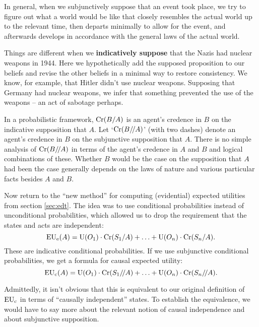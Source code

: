 In general, when we subjunctively suppose that an event took place, we try to
figure out what a world would be like that closely resembles the actual world up
to the relevant time, then departs minimally to allow for the event, and
afterwards develops in accordance with the general laws of the actual world.

Things are different when we \textbf{indicatively suppose} that the Nazis had
nuclear weapons in 1944. Here we hypothetically add the supposed proposition to
our beliefs and revise the other beliefs in a minimal way to restore
consistency. We know, for example, that Hitler didn't use nuclear weapons.
Supposing that Germany had nuclear weapons, we infer that something prevented
the use of the weapons -- an act of sabotage perhaps.

In a probabilistic framework, $\text{Cr}(B/A)$ is an agent's credence in $B$ on the
indicative supposition that $A$. Let `$\text{Cr}(B/\!/A)$' (with two dashes) denote an
agent's credence in $B$ on the subjunctive supposition that $A$. There is no
simple analysis of $\text{Cr}(B/\!/A)$ in terms of the agent's credence in $A$ and $B$
and logical combinations of these. Whether $B$ would be the case on the
supposition that $A$ had been the case generally depends on the laws of nature
and various particular facts besides $A$ and $B$.


Now return to the ``new method'' for computing (evidential) expected utilities
from section \ref{sec:edt}. The idea was to use conditional probabilities
instead of unconditional probabilities, which allowed us to drop the requirement
that the states and acts are independent:
\[
  \text{EU}_\text{e}(A) = \text{U}(O_1) \cdot \text{Cr}(S_1/A) + \ldots + \text{U}(O_n) \cdot \text{Cr}(S_n/A).
\]
These are indicative conditional probabilities. If we use subjunctive
conditional probabilities, we get a formula for causal expected utility:
\[
  \text{EU}_\text{c}(A) = \text{U}(O_1) \cdot \text{Cr}(S_1/\!/A) + \ldots + \text{U}(O_n) \cdot \text{Cr}(S_n/\!/A).
\]

Admittedly, it isn't obvious that this is equivalent to our original definition
of $\text{EU}_\text{c}$ in terms of ``causally independent'' states. To establish the
equivalence, we would have to say more about the relevant notion of causal
independence and about subjunctive supposition.

